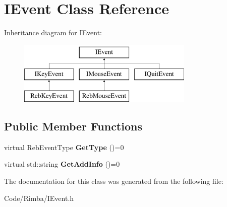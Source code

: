 \hypertarget{class_i_event}{}\section{I\+Event Class Reference}
\label{class_i_event}
Inheritance diagram for I\+Event\+:\begin{figure}[H]
\begin{center}
\leavevmode
\includegraphics[height=3.000000cm]{class_i_event}
\end{center}
\end{figure}
\subsection*{Public Member Functions}
\begin{DoxyCompactItemize}
\item 
virtual Reb\+Event\+Type {\bfseries Get\+Type} ()=0\hypertarget{class_i_event_acca503dbd25c63119aa0dd4c36e3a148}{}\label{class_i_event_acca503dbd25c63119aa0dd4c36e3a148}

\item 
virtual std\+::string {\bfseries Get\+Add\+Info} ()=0\hypertarget{class_i_event_a9a1417c438733cec89a00f1a97c6cfd9}{}\label{class_i_event_a9a1417c438733cec89a00f1a97c6cfd9}

\end{DoxyCompactItemize}


The documentation for this class was generated from the following file\+:\begin{DoxyCompactItemize}
\item 
Code/\+Rimba/I\+Event.\+h\end{DoxyCompactItemize}
